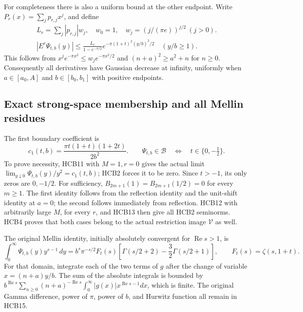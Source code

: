 \documentclass[11pt]{article}
\begin{document}
For completeness there is also a uniform bound at the other endpoint.
Write $P_r(x)=\sum_jp_{r,j}x^j$, and define
\begin{equation}\tag{HCB13}\begin{gathered}
 L_r=\sum_j|p_{r,j}|w_j,
 \quad w_0=1,\quad w_j=(j/(\pi e))^{j/2}\ (j>0).
 \\
 |E^r\Psi_{t,b}(y)|\leq
 \frac{L_r}{1-e^{-\pi/2}}
 e^{-\pi(1+t)^2(y/b)^2/2}\quad(y/b\geq1).
\end{gathered}
\end{equation}
This follows from
$x^je^{-\pi x^2}\leq w_je^{-\pi x^2/2}$ and
$(n+a)^2\geq a^2+n$ for $n\geq0$. Consequently all derivatives
have Gaussian decrease at infinity, uniformly when
$a\in[a_0,A]$ and $b\in[b_0,b_1]$ with positive endpoints.

\subsection{Exact strong-space membership and all Mellin residues}

The first boundary coefficient is
\begin{equation}\tag{HCB14}
 c_1(t,b)=\frac{\pi t(1+t)(1+2t)}{2b^2}.
 \qquad
 \Psi_{t,b}\in\mathcal B
       \quad\Longleftrightarrow\quad t\in\{0,-\tfrac12\}.
\end{equation}
To prove necessity, HCB11 with $M=1,r=0$ gives the actual limit
$\lim_{y\downarrow0}\Psi_{t,b}(y)/y^2=c_1(t,b)$; HCB2 forces it
to be zero. Since $t>-1$, its only zeros are $0,-1/2$. For
sufficiency, $B_{2m+1}(1)=B_{2m+1}(1/2)=0$ for every $m\geq1$.
The first identity follows from the reflection identity and the
unit-shift identity at $a=0$; the second follows immediately from
reflection. HCB12 with arbitrarily large $M$, for every $r$, and
HCB13 then give all HCB2 seminorms. HCB4 proves that both cases
belong to the actual restriction image $\mathcal V$ as well.

The original Mellin identity, initially absolutely convergent for
$\operatorname{Re}s>1$, is
\begin{equation}\tag{HCB15}
 \int_0^\infty\Psi_{t,b}(y)y^{s-1}\,dy
 =b^s\pi^{-s/2}F_t(s)
       \left[\Gamma(s/2+2)-\frac32\Gamma(s/2+1)\right],
 \qquad F_t(s)=\zeta(s,1+t).
\end{equation}
For that domain, integrate each of the two terms of $g$ after
the change of variable $x=(n+a)y/b$. The sum of the absolute
integrals is bounded by
$b^{\operatorname{Re}s}\sum_{n\geq0}(n+a)^{-\operatorname{Re}s}
\int_0^\infty|g(x)|x^{\operatorname{Re}s-1}dx$, which is finite.
The original Gamma difference, power of $\pi$, power of $b$, and
Hurwitz function all remain in HCB15.
\end{document}
